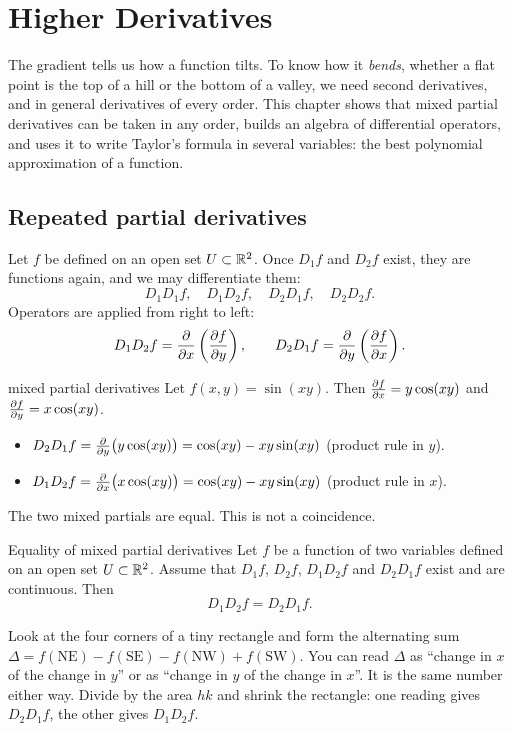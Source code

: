 \clearpage
{}\renewcommand{\tabname}{III}
\chapter{Higher Derivatives}\label{ch:higher}

The gradient tells us how a function tilts. To know how it \emph{bends}, whether a flat
point is the top of a hill or the bottom of a valley, we need second derivatives, and in
general derivatives of every order. This chapter shows that mixed partial derivatives can
be taken in any order, builds an algebra of differential operators, and uses it to write
Taylor's formula in several variables: the best polynomial approximation of a function.

\section{Repeated partial derivatives}

Let $f$ be defined on an open set $U\subset\mathbb{R}^2$. Once $D_1f$ and $D_2f$ exist, they are
functions again, and we may differentiate them:
\[ D_1D_1f,\quad D_1D_2f,\quad D_2D_1f,\quad D_2D_2f . \]
Operators are applied from right to left:
\[
D_1D_2f=\frac{\partial }{\partial x}\left(\frac{\partial f}{\partial y}\right),\qquad D_2D_1f=\frac{\partial }{\partial y}\left(\frac{\partial f}{\partial x}\right).
\]

\begin{example}{mixed partial derivatives}
Let $f(x,y)=\sin(xy)$. Then $\frac{\partial f}{\partial x}=y\cos(xy)$ and $\frac{\partial f}{\partial y}=x\cos(xy)$.
\begin{itemize}
  \item $D_2D_1f=\frac{\partial }{\partial y}\big(y\cos(xy)\big)=\cos(xy)-xy\sin(xy)$ (product rule in $y$).
  \item $D_1D_2f=\frac{\partial }{\partial x}\big(x\cos(xy)\big)=\cos(xy)-xy\sin(xy)$ (product rule in $x$).
\end{itemize}
The two mixed partials are equal. This is not a coincidence.
\end{example}

\begin{theorem}[label=thm:schwarz]{Equality of mixed partial derivatives}
Let $f$ be a function of two variables defined on an open set $U\subset\mathbb{R}^2$. Assume that
$D_1f$, $D_2f$, $D_1D_2f$ and $D_2D_1f$ exist and are continuous. Then
\[ D_1D_2f=D_2D_1f . \]
\end{theorem}

\begin{intuition}
Look at the four corners of a tiny rectangle and form the alternating sum
$\Delta=f(\text{NE})-f(\text{SE})-f(\text{NW})+f(\text{SW})$. You can read $\Delta$ as
``change in $x$ of the change in $y$'' or as ``change in $y$ of the change in $x$''. It is
the same number either way. Divide by the area $hk$ and shrink the rectangle: one reading
gives $D_2D_1f$, the other gives $D_1D_2f$.
\end{intuition}

